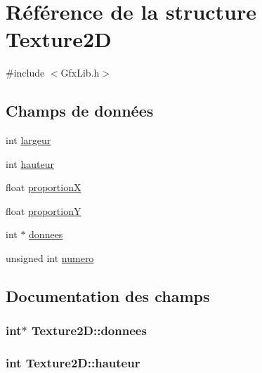 \hypertarget{struct_texture2_d}{}\section{Référence de la structure Texture2D}
\label{struct_texture2_d}


{\ttfamily \#include $<$Gfx\+Lib.\+h$>$}

\subsection*{Champs de données}
\begin{DoxyCompactItemize}
\item 
int \hyperlink{struct_texture2_d_a21ab2d185b964d6663995ed3cb044611}{largeur}
\item 
int \hyperlink{struct_texture2_d_a8472bcc66f418ac9226f4d914e5128a4}{hauteur}
\item 
float \hyperlink{struct_texture2_d_ac7d624b3aab0cd29f551e104f72bc939}{proportionX}
\item 
float \hyperlink{struct_texture2_d_a6355c1365aa11fe62e65959d9e5efabf}{proportionY}
\item 
int $\ast$ \hyperlink{struct_texture2_d_a71a060bda235dd5aa1af48e238a8a3e7}{donnees}
\item 
unsigned int \hyperlink{struct_texture2_d_a39a209135bf27bf53f0ae2882e39f309}{numero}
\end{DoxyCompactItemize}


\subsection{Documentation des champs}
\subsubsection[{\texorpdfstring{donnees}{donnees}}]{\setlength{\rightskip}{0pt plus 5cm}int$\ast$ Texture2\+D\+::donnees}\hypertarget{struct_texture2_d_a71a060bda235dd5aa1af48e238a8a3e7}{}\label{struct_texture2_d_a71a060bda235dd5aa1af48e238a8a3e7}
\subsubsection[{\texorpdfstring{hauteur}{hauteur}}]{\setlength{\rightskip}{0pt plus 5cm}int Texture2\+D\+::hauteur}\hypertarget{struct_texture2_d_a8472bcc66f418ac9226f4d914e5128a4}{}\label{struct_texture2_d_a8472bcc66f418ac9226f4d914e5128a4}
